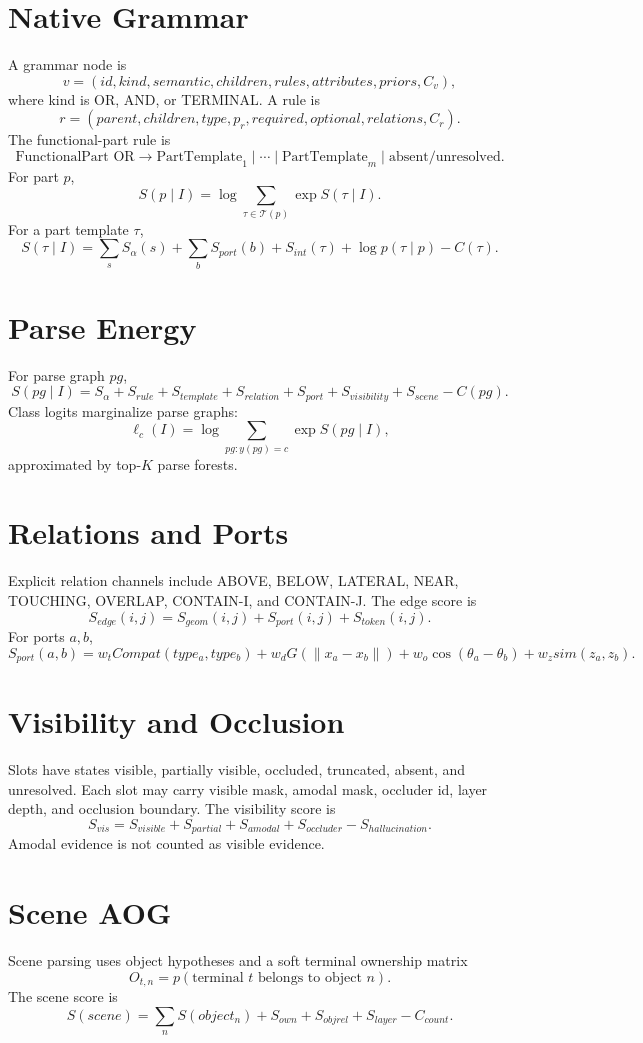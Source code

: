 \documentclass[11pt]{article}
\begin{document}
\section{Native Grammar}
A grammar node is
\[
v=(id,kind,semantic,children,rules,attributes,priors,C_v),
\]
where kind is OR, AND, or TERMINAL. A rule is
\[
r=(parent,children,type,p_r,required,optional,relations,C_r).
\]
The functional-part rule is
\[
\text{FunctionalPart OR}\rightarrow \text{PartTemplate}_1\mid\cdots\mid\text{PartTemplate}_m\mid\text{absent/unresolved}.
\]
For part $p$,
\[
S(p\mid I)=\log\sum_{\tau\in\mathcal T(p)}\exp S(\tau\mid I).
\]
For a part template $\tau$,
\[
S(\tau\mid I)=\sum_s S_\alpha(s)+\sum_b S_{port}(b)+S_{int}(\tau)+\log p(\tau\mid p)-C(\tau).
\]

\section{Parse Energy}
For parse graph $pg$,
\[
S(pg\mid I)=S_\alpha+S_{rule}+S_{template}+S_{relation}+S_{port}+S_{visibility}+S_{scene}-C(pg).
\]
Class logits marginalize parse graphs:
\[
\ell_c(I)=\log\sum_{pg:y(pg)=c}\exp S(pg\mid I),
\]
approximated by top-$K$ parse forests.

\section{Relations and Ports}
Explicit relation channels include ABOVE, BELOW, LATERAL, NEAR, TOUCHING, OVERLAP, CONTAIN-I, and CONTAIN-J.  The edge score is
\[
S_{edge}(i,j)=S_{geom}(i,j)+S_{port}(i,j)+S_{token}(i,j).
\]
For ports $a,b$,
\[
S_{port}(a,b)=w_t Compat(type_a,type_b)+w_dG(\|x_a-x_b\|)+w_o\cos(\theta_a-\theta_b)+w_z sim(z_a,z_b).
\]

\section{Visibility and Occlusion}
Slots have states visible, partially visible, occluded, truncated, absent, and unresolved.  Each slot may carry visible mask, amodal mask, occluder id, layer depth, and occlusion boundary. The visibility score is
\[
S_{vis}=S_{visible}+S_{partial}+S_{amodal}+S_{occluder}-S_{hallucination}.
\]
Amodal evidence is not counted as visible evidence.

\section{Scene AOG}
Scene parsing uses object hypotheses and a soft terminal ownership matrix
\[
O_{t,n}=p(\text{terminal }t\text{ belongs to object }n).
\]
The scene score is
\[
S(scene)=\sum_n S(object_n)+S_{own}+S_{objrel}+S_{layer}-C_{count}.
\]
\end{document}
